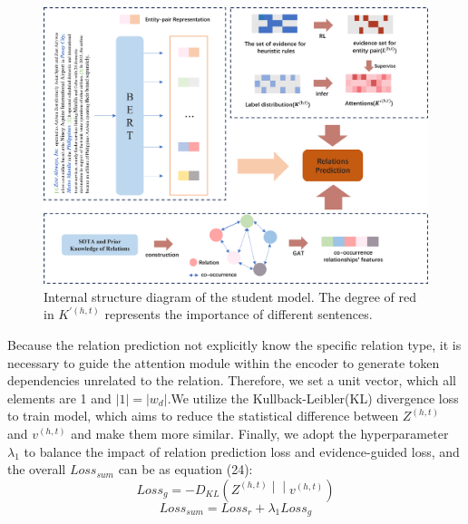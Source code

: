 \documentclass[preprint,12pt]{elsarticle}
\begin{document}
\begin{figure}[htbp]
\centering
\includegraphics[width=4.5in]{./student_model.png}
\caption{ Internal structure diagram of the student model. The degree of red in $K^{'(h,t)} $ represents the importance of different sentences.}
\label{fig.3}
\end{figure}
Because the relation prediction not explicitly know the specific relation type, it is necessary to guide the attention module within the encoder to generate token dependencies unrelated to the relation. Therefore, we set a unit vector, which all elements are 1 and $|1|=|w_d|$.We utilize the Kullback-Leibler(KL) divergence loss to train model, which aims to reduce the statistical difference between $Z^{(h,t)}$  and $v^{(h,t)}$ and make them more similar. Finally, we adopt the hyperparameter $\lambda_1$ to balance the impact of relation prediction loss and evidence-guided loss, and the overall $Loss_{sum}$ can be as equation (24):
\begin{equation}
{Loss}_{g} = - D_{KL}\left( Z^{({h,t})} \middle| \middle| v^{(h,t)} \right)
\label{eq22}
\end{equation}
\begin{equation}
{Loss}_{sum} = {Loss}_{r} + \lambda_{1}{Loss}_{g}
\label{eq23}
\end{equation}
\end{document}

